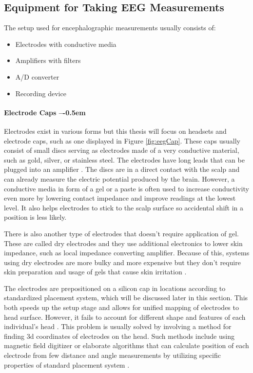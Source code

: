 \subsection{Equipment for Taking EEG Measurements}
The setup used for encephalographic measurements usually consists of: 
\begin{itemize}
  \item Electrodes with conductive media
  \item Amplifiers with filters
  \item A/D converter
  \item Recording device
\end{itemize}

\paragraph{Electrode Caps --\kern-0.5em}
Electrodes exist in various forms but this thesis will focus on
headsets and electrode caps, such as one displayed in Figure \ref{fig:eegCap}.
These caps usually consist of small discs serving as electrodes made
of a very conductive material, such as gold, silver, or stainless steel. The electrodes have long leads that can be plugged into an
amplifier \cite{eegFund}. The discs are in a direct contact with the scalp and can already
measure the electric potential produced by the brain. However, a conductive media in form of a
gel or a paste is often used to increase conductivity even more by lowering
contact impedance and improve readings at the lowest level. It also helps
electrodes to stick to the scalp surface so accidental shift in a position is less likely. 

There is also another type of electrodes that doesn't require application of gel. These are called dry electrodes and they use additional electronics to lower skin impedance, such as local impedance converting amplifier. Because of this, systems using dry electrodes are more bulky and more expensive but they don't require skin preparation and usage of gels that cause skin irritation \cite{dryElectrodes}. 

The electrodes are prepositioned on a silicon cap in locations according to
standardized placement system, which will be discussed later in this section.
This both speeds up the setup stage and allows for unified mapping of electrodes
to head surface. However, it fails to account for different shape and features of each
individual's head \cite{eegFund}. This problem is usually solved by involving a
method for finding \gls{3d} coordinates of electrodes on the head. Such methods
include using magnetic field digitizer or elaborate algorithms that can
calculate position of each electrode from few distance and angle measurements by
utilizing specific properties of standard placement system \cite{rapidPos}.

